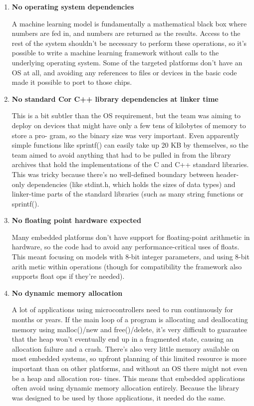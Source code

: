 \begin{enumerate}
	
	\item \textbf{No operating system dependencies}
	
	A machine learning model is fundamentally a mathematical black box where numbers are fed in, and numbers are returned as the results. Access to the rest of the system shouldn't be necessary to perform these operations, so it's possible to write a machine learning framework without calls to the underlying operating system. Some of the targeted platforms don't have an OS at all, and avoiding any references to files or devices in the basic code made it possible to port to those chips.\cite{War:2020}
	
	\item \textbf{No standard Cor C++ library dependencies at linker time }
	
	This is a bit subtler than the OS requirement, but the team was aiming to deploy on devices that might have only a few tens of kilobytes of memory to store a pro- gram, so the binary size was very important. Even apparently simple functions like sprintf() can easily take up 20 KB by themselves, so the team aimed to avoid anything that had to be pulled in from the library archives that hold the implementations of the C and C++ standard libraries. This was tricky because there's no well-defined boundary between header-only dependencies (like stdint.h, which holds the sizes of data types) and linker-time parts of the standard libraries (such as many string functions or sprintf().
	
	\item \textbf{No floating point hardware expected }
	
	Many embedded platforms don't have support for floating-point arithmetic in hardware, so the code had to avoid any performance-critical uses of floats. This meant focusing on models with 8-bit integer parameters, and using 8-bit arith metic within operations (though for compatibility the framework also supports float ops if they're needed). \cite{Ard:2021}
	
	\item \textbf{No dynamic memory allocation}
	
	A lot of applications using microcontrollers need to run continuously for months or years. If the main loop of a program is allocating and deallocating memory using malloc()/new and free()/delete, it's very difficult to guarantee that the heap won't eventually end up in a fragmented state, causing an allocation failure and a crash. There's also very little memory available on most embedded systems, so upfront planning of this limited resource is more important than on other platforms, and without an OS there might not even be a heap and allocation rou- tines. This means that embedded applications often avoid using dynamic memory allocation entirely. Because the library was designed to be used by those applications, it needed do the same. 
	

\end{enumerate}

